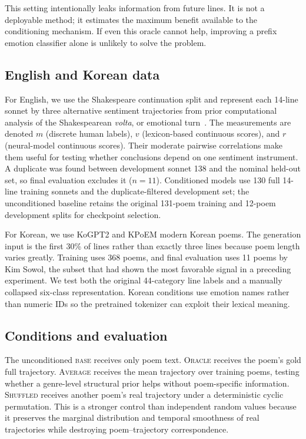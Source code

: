 \documentclass{article}
\begin{document}
This setting intentionally leaks information from future lines. It is not a deployable method; it estimates the maximum benefit available to the conditioning mechanism. If even this oracle cannot help, improving a prefix emotion classifier alone is unlikely to solve the problem.

\subsection{English and Korean data}

For English, we use the Shakespeare continuation split and represent each 14-line sonnet by three alternative sentiment trajectories from prior computational analysis of the Shakespearean \emph{volta}, or emotional turn~\citep{lee2025volta}. The measurements are denoted $m$ (discrete human labels), $v$ (lexicon-based continuous scores), and $r$ (neural-model continuous scores). Their moderate pairwise correlations make them useful for testing whether conclusions depend on one sentiment instrument. A duplicate was found between development sonnet 138 and the nominal held-out set, so final evaluation excludes it ($n=11$). Conditioned models use 130 full 14-line training sonnets and the duplicate-filtered development set; the unconditioned baseline retains the original 131-poem training and 12-poem development splits for checkpoint selection.

For Korean, we use KoGPT2 and KPoEM modern Korean poems. The generation input is the first 30\% of lines rather than exactly three lines because poem length varies greatly. Training uses 368 poems, and final evaluation uses 11 poems by Kim Sowol, the subset that had shown the most favorable signal in a preceding experiment. We test both the original 44-category line labels and a manually collapsed six-class representation. Korean conditions use emotion names rather than numeric IDs so the pretrained tokenizer can exploit their lexical meaning.

\subsection{Conditions and evaluation}

The unconditioned \textsc{base} receives only poem text. \textsc{Oracle} receives the poem's gold full trajectory. \textsc{Average} receives the mean trajectory over training poems, testing whether a genre-level structural prior helps without poem-specific information. \textsc{Shuffled} receives another poem's real trajectory under a deterministic cyclic permutation. This is a stronger control than independent random values because it preserves the marginal distribution and temporal smoothness of real trajectories while destroying poem--trajectory correspondence.
\end{document}
